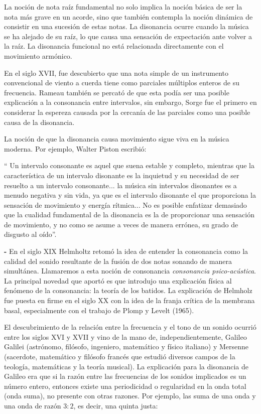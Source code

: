 \documentclass[11pt,a4paper]{article}
\begin{document}
	La noción de nota raíz fundamental no solo implica la noción básica de ser la nota más grave en un acorde, sino que también contempla la noción dinámica de consistir en una sucesión de estas notas. La disonancia ocurre cuando la música se ha alejado de su raíz, lo que causa una sensación de expectación ante volver a la raíz. La disonancia funcional no está relacionada directamente con el movimiento armónico.
	
	En el siglo XVII, fue descubierto que una nota simple de un instrumento convencional de viento a cuerda tiene como parciales múltiplos enteros de su frecuencia. Rameau también se percató de que esta podía ser una posible explicación a la consonancia entre intervalos, sin embargo, Sorge fue el primero en considerar la espereza causada por la cercanía de las parciales como una posible causa de la disonancia.
	
	La noción de que la disonancia causa movimiento sigue viva en la música moderna. Por ejemplo, Walter Piston escribió:
	
	\begin{center}
    	`` Un intervalo consonante es aquel que suena estable y completo, mientras que la característica de un intervalo disonante es la inquietud y su necesidad de ser resuelto a un intervalo consonante... la música sin intervalos disonantes es a menudo negativa y sin vida, ya que es el intervalo disonante el que proporciona la sensación de movimiento y energía rítmica... No es posible enfatizar demasiado que la cualidad fundamental de la disonancia es la de proporcionar una sensación de movimiento, y no como se asume a veces de manera errónea, su grado de disgusto al oído''.       %
	\end{center}
	
	\textbf{-} En el siglo XIX Helmholtz retomó la idea de entender la consonancia como la calidad del sonido resultante de la fusión de dos notas sonando de manera simultánea. Llamaremos a esta noción de consonancia \emph{consonancia psico-acústica}. La principal novedad que aportó es que introdujo una explicación física al fenómeno de la consonancia: la teoría de los batidos. La explicación de Helmholz fue puesta en firme en el siglo XX con la idea de la franja crítica de la membrana basal, especialmente con el trabajo de Plomp y Levelt (1965).
	
	El descubrimiento de la relación entre la frecuencia y el tono de un sonido ocurrió entre los siglos XVI y XVII y vino de la mano de, independientemente, Galileo Galilei (astrónomo, filósofo, ingeniero, matemático y físico italiano) y Mersenne (sacerdote, matemático y filósofo francés que estudió diversos campos de la teología, matemáticas y la teoría musical). La explicación para la disonancia de Galileo era que si la razón entre las frecuencias de los sonidos implicados es un número entero, entonces existe una periodicidad o regularidad en la onda total (onda suma), no presente con otras razones. Por ejemplo, las suma de una onda y una onda de razón $3:2$, es decir, una quinta justa:
	
\end{document}
